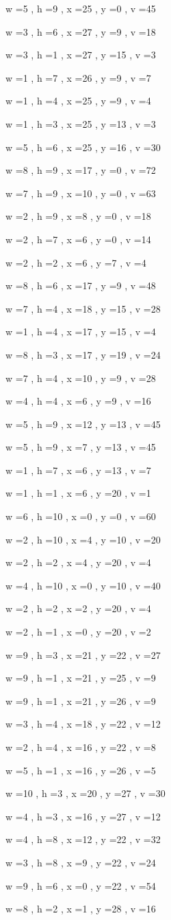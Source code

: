 \documentclass[11pt]{article}
\begin{document}
w =5 , h =9 , x =25 , y =0 , v =45
\par
w =3 , h =6 , x =27 , y =9 , v =18
\par
w =3 , h =1 , x =27 , y =15 , v =3
\par
w =1 , h =7 , x =26 , y =9 , v =7
\par
w =1 , h =4 , x =25 , y =9 , v =4
\par
w =1 , h =3 , x =25 , y =13 , v =3
\par
w =5 , h =6 , x =25 , y =16 , v =30
\par
w =8 , h =9 , x =17 , y =0 , v =72
\par
w =7 , h =9 , x =10 , y =0 , v =63
\par
w =2 , h =9 , x =8 , y =0 , v =18
\par
w =2 , h =7 , x =6 , y =0 , v =14
\par
w =2 , h =2 , x =6 , y =7 , v =4
\par
w =8 , h =6 , x =17 , y =9 , v =48
\par
w =7 , h =4 , x =18 , y =15 , v =28
\par
w =1 , h =4 , x =17 , y =15 , v =4
\par
w =8 , h =3 , x =17 , y =19 , v =24
\par
w =7 , h =4 , x =10 , y =9 , v =28
\par
w =4 , h =4 , x =6 , y =9 , v =16
\par
w =5 , h =9 , x =12 , y =13 , v =45
\par
w =5 , h =9 , x =7 , y =13 , v =45
\par
w =1 , h =7 , x =6 , y =13 , v =7
\par
w =1 , h =1 , x =6 , y =20 , v =1
\par
w =6 , h =10 , x =0 , y =0 , v =60
\par
w =2 , h =10 , x =4 , y =10 , v =20
\par
w =2 , h =2 , x =4 , y =20 , v =4
\par
w =4 , h =10 , x =0 , y =10 , v =40
\par
w =2 , h =2 , x =2 , y =20 , v =4
\par
w =2 , h =1 , x =0 , y =20 , v =2
\par
w =9 , h =3 , x =21 , y =22 , v =27
\par
w =9 , h =1 , x =21 , y =25 , v =9
\par
w =9 , h =1 , x =21 , y =26 , v =9
\par
w =3 , h =4 , x =18 , y =22 , v =12
\par
w =2 , h =4 , x =16 , y =22 , v =8
\par
w =5 , h =1 , x =16 , y =26 , v =5
\par
w =10 , h =3 , x =20 , y =27 , v =30
\par
w =4 , h =3 , x =16 , y =27 , v =12
\par
w =4 , h =8 , x =12 , y =22 , v =32
\par
w =3 , h =8 , x =9 , y =22 , v =24
\par
w =9 , h =6 , x =0 , y =22 , v =54
\par
w =8 , h =2 , x =1 , y =28 , v =16
\par
\newpage
\end{document}
